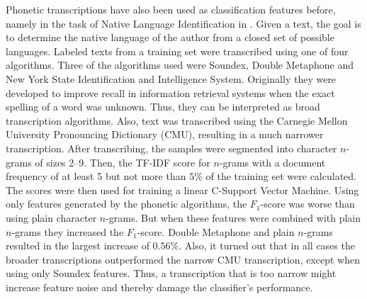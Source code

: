 Phonetic transcriptions have also been used as classification features before, namely in the task of Native Language Identification in \cite{smiley2017native}.
Given a text, the goal is to determine the native language of the author from a closed set of possible languages.
Labeled texts from a training set were transcribed using one of four algorithms.
Three of the algorithms used were Soundex, Double Metaphone and New York State Identification and Intelligence System.
Originally they were developed to improve recall in information retrieval systems when the exact spelling of a word was unknown.
Thus, they can be interpreted as broad transcription algorithms.
Also, text was transcribed using the Carnegie Mellon University Pronouncing Dictionary (CMU), resulting in a much narrower transcription.
After transcribing, the samples were segmented into character $n$-grams of sizes 2--9.
Then, the TF-IDF score for $n$-grams with a document frequency of at least 5 but not more than $5\%$ of the training set were calculated.
The scores were then used for training a linear C-Support Vector Machine.
Using only features generated by the phonetic algorithms, the $F_1$-score was worse than using plain character $n$-grams.
But when these features were combined with plain $n$-grams they increased the $F_1$-score.
Double Metaphone and plain $n$-grams resulted in the largest increase of $0.56\%$.
Also, it turned out that in all cases the broader transcriptions outperformed the narrow CMU transcription, except when using only Soundex features.
Thus, a transcription that is too narrow might increase feature noise and thereby damage the classifier's performance.